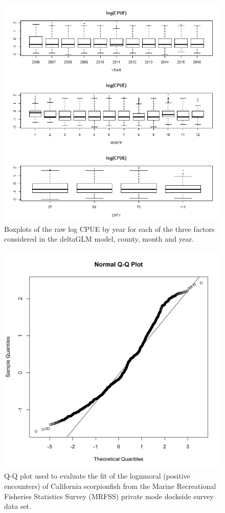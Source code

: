\documentclass[12pt,]{article}
\begin{document}
\begin{figure}[htbp]
\centering
\includegraphics{Figures/Fleet4_RecPR_dockside_lograwCPUE.png}
\caption{Boxplots of the raw log CPUE by year for each of the three
factors considered in the deltaGLM model, county, month and year.
\label{fig:Fleet4_RecPR_dockside_lograwCPUE}}
\end{figure}

\begin{figure}[htbp]
\centering
\includegraphics{Figures/Fleet4_RecPR_dockside_QQ.png}
\caption{Q-Q plot used to evaluate the fit of the lognmoral (positive
encounters) of California scorpionfish from the Marine Recreational
Fisheries Statistics Survey (MRFSS) private mode dockside survey data
set. \label{fig:Fleet4_RecPR_dockside_QQ}}
\end{figure}
\end{document}
